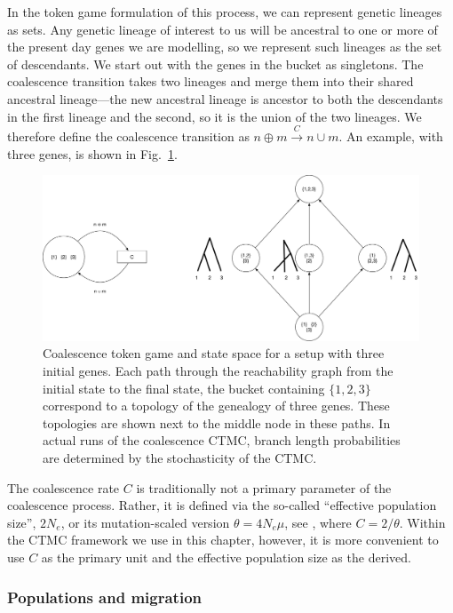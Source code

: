 \documentclass[graybox]{svmult}
\newcommand{\trans}[3]{\ensuremath{#1 \xrightarrow{#2} #3}}
\begin{document}
In the token game formulation of this process, we can represent genetic lineages as sets. Any genetic lineage of interest to us will be ancestral to one or more of the present day genes we are modelling, so we represent such lineages as the set of descendants. We start out with the genes in the bucket as singletons. The coalescence transition takes two lineages and merge them into their shared ancestral lineage---the new ancestral lineage is ancestor to both the descendants in the first lineage and the second, so it is the union of the two lineages. We therefore define the coalescence transition as \trans{n \oplus m}{C}{n \cup m}. An example, with three genes, is shown in Fig.~\ref{fig:coalescence-CPN}.

\begin{figure}[h]
\sidecaption[t]
\includegraphics[scale=.25]{figures/coalescence-CPN}
\caption{Coalescence token game and state space for a setup with three initial genes. Each path through the reachability graph from the initial state to the final state, the bucket containing $\{1,2,3\}$ correspond to a topology of the genealogy of three genes. These topologies are shown next to the middle node in these paths. In actual runs of the coalescence CTMC, branch length probabilities are determined by the stochasticity of the CTMC.}
\label{fig:coalescence-CPN}
\end{figure}

The coalescence rate $C$ is traditionally not a primary parameter of the coalescence process. Rather, it is defined via the so-called ``effective population size'', $2N_e$, or its mutation-scaled version $\theta=4 N_e \mu$, see \citet{Hein:2004ta}, where $C=2/\theta$. Within the CTMC framework we use in this chapter, however, it is more convenient to use $C$ as the primary unit and the effective population size as the derived.


\subsubsection{Populations and migration}
\end{document}
